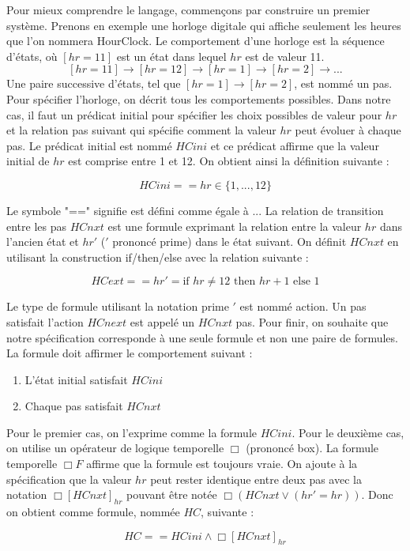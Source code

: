 \documentclass[12pt,a4paper]{article}
\begin{document}
Pour mieux comprendre le langage, commençons par construire un premier système. Prenons en exemple une horloge digitale qui affiche seulement les heures que l'on nommera HourClock. Le comportement d'une horloge est la séquence d'états, où $[hr = 11]$ est un état dans lequel $ hr $ est de valeur 11.
$$ [hr = 11] \rightarrow [hr = 12] \rightarrow [hr = 1] \rightarrow [hr = 2] \rightarrow ...$$
Une paire successive d'états, tel que $[hr = 1] \rightarrow [hr = 2]$, est nommé un pas.
Pour spécifier l'horloge, on décrit tous les comportements possibles. Dans notre cas, il faut un prédicat initial pour spécifier les choix possibles de valeur pour $hr$ et la relation pas suivant qui spécifie comment la valeur $hr$ peut évoluer à chaque pas.
Le prédicat initial est nommé $HCini$ et ce prédicat affirme que la valeur initial de $hr$ est comprise entre 1 et 12. On obtient ainsi la définition suivante :

$$ HCini == hr \in \{1,...,12\}$$

Le symbole "==" signifie est défini comme égale à ... 
La relation de transition entre les pas $HCnxt$ est une formule exprimant la relation entre la valeur $hr$ dans l'ancien état et $hr'$ ($'$ prononcé prime) dans le état suivant. On définit $HCnxt$ en utilisant la construction if/then/else avec la relation suivante :   

$$ HCext == hr' = \text{if } hr \neq 12 \text{ then } hr + 1 \text{ else } 1 $$

Le type de formule utilisant la notation prime $'$ est nommé action. Un pas satisfait l'action $HCnext$ est appelé un $HCnxt$ pas.
Pour finir, on souhaite que notre spécification corresponde à une seule formule et non une paire de formules. La formule doit affirmer le comportement suivant :
\begin{enumerate}
	\item L'état initial satisfait $HCini$
	\item Chaque pas satisfait $HCnxt$
\end{enumerate}
Pour le premier cas, on l'exprime comme la formule $HCini$. Pour le deuxième cas, on utilise un opérateur de logique temporelle $\Box$ (prononcé box). La formule temporelle $\Box F$ affirme que la formule est toujours vraie. On ajoute à la spécification que la valeur $hr$ peut rester identique entre deux pas avec la notation $\Box [HCnxt]_{hr}$ pouvant être notée $\Box (HCnxt \lor (hr' = hr ))$. Donc on obtient comme formule, nommée $HC$, suivante :

$$ HC == HCini  \land  \Box [HCnxt]_{hr} $$
\end{document}
